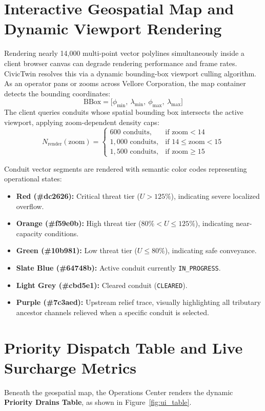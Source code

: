\section{Interactive Geospatial Map and Dynamic Viewport Rendering}
Rendering nearly 14,000 multi-point vector polylines simultaneously inside a client browser canvas can degrade rendering performance and frame rates. CivicTwin resolves this via a dynamic bounding-box viewport culling algorithm. As an operator pans or zooms across Vellore Corporation, the map container detects the bounding coordinates:
\begin{equation}
\text{BBox} = \big[\phi_{\min},~\lambda_{\min},~\phi_{\max},~\lambda_{\max}\big]
\end{equation}
The client queries conduits whose spatial bounding box intersects the active viewport, applying zoom-dependent density caps:
\begin{equation}
N_{\text{render}}(\text{zoom}) = \begin{cases}
600 \text{ conduits}, & \text{if zoom} < 14 \\
1{,}000 \text{ conduits}, & \text{if } 14 \le \text{zoom} < 15 \\
1{,}500 \text{ conduits}, & \text{if zoom} \ge 15
\end{cases}
\end{equation}

Conduit vector segments are rendered with semantic color codes representing operational states:
\begin{itemize}
    \item \textbf{Red (\#dc2626):} Critical threat tier ($U > 125\%$), indicating severe localized overflow.
    \item \textbf{Orange (\#f59e0b):} High threat tier ($80\% < U \le 125\%$), indicating near-capacity conditions.
    \item \textbf{Green (\#10b981):} Low threat tier ($U \le 80\%$), indicating safe conveyance.
    \item \textbf{Slate Blue (\#64748b):} Active conduit currently \texttt{IN\_PROGRESS}.
    \item \textbf{Light Grey (\#cbd5e1):} Cleared conduit (\texttt{CLEARED}).
    \item \textbf{Purple (\#7c3aed):} Upstream relief trace, visually highlighting all tributary ancestor channels relieved when a specific conduit is selected.
\end{itemize}

\section{Priority Dispatch Table and Live Surcharge Metrics}
Beneath the geospatial map, the Operations Center renders the dynamic \textbf{Priority Drains Table}, as shown in Figure~\ref{fig:ui_table}.

